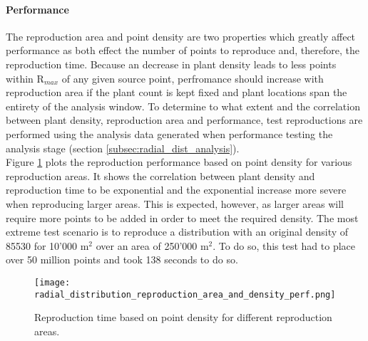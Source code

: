\paragraph{Performance}

The reproduction area and point density are two properties which greatly affect performance as both effect the number of points to reproduce and, therefore, the reproduction time. Because an decrease in plant density leads to less points within R$_{max}$ of any given source point, perfromance should increase with reproduction area if the plant count is kept fixed and plant locations span the entirety of the analysis window. To determine to what extent and the correlation between plant density, reproduction area and performance, test reproductions are performed using the analysis data generated when performance testing the analysis stage (section \ref{subsec:radial_dist_analysis}).\\

Figure \ref{fig:reproduction_density_area_perf} plots the reproduction performance based on point density for various reproduction areas. It shows the correlation between plant density and reproduction time to be exponential and the exponential increase more severe when reproducing larger areas. This is expected, however, as larger areas will require more points to be added in order to meet the required density. The most extreme test scenario is to reproduce a distribution with an original density of 85530 for 10'000 m$^{2}$ over an area of 250'000 m$^{2}$. To do so, this test had to place over 50 million points and took 138 seconds to do so.\\

\begin{figure}
\center
	\texttt{[image: radial\_distribution\_reproduction\_area\_and\_density\_perf.png]}
	\caption{ Reproduction time based on point density for different reproduction areas.}	
	\label{fig:reproduction_density_area_perf}
\end{figure}

